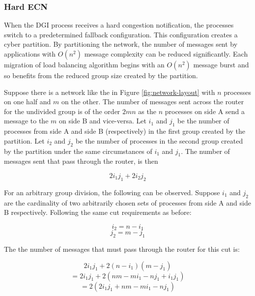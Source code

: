 \subsubsection{Hard \ac{ECN}}

When the \ac{DGI} process receives a hard congestion notification, the processes switch to a predetermined fallback configuration.
This configuration creates a cyber partition.
By partitioning the network, the number of messages sent by applications with $O(n^2)$ message complexity can be reduced significantly.
Each migration of load balancing algorithm begins with an $O(n^2)$ message burst and so benefits from the reduced group size created by the partition.

Suppose there is a network like the in Figure \ref{fig:network-layout} with $n$ processes on one half and $m$ on the other.
The number of messages sent across the router for the undivided group is of the order $2mn$ as the $n$ processes on side A send a message to the $m$ on side B and vice-versa.
Let $i_{1}$ and $j_{1}$ be the number of processes from side A and side B (respectively) in the first group created by the partition.
Let $i_{2}$ and $j_{2}$ be the number of processes in the second group created by the partition under the same circumstances of $i_1$ and $j_1$.
The number of messages sent that pass through the router, is then 

\begin{equation}
2 i_{1} j_{1} + 2 i_{2} j_{2}
\end{equation}

For an arbitrary group division, the following can be observed.
Suppose $i_{1}$ and $j_{2}$ are the cardinality of two arbitrarily chosen sets of processes from side A and side B respectively.
Following the same cut requirements as before:

\begin{equation}
i_2 = n - i_1
\end{equation}
\begin{equation}
j_2 = m - j_1
\end{equation}

The the number of messages that must pass through the router for this cut is:

\begin{equation}
2 i_{1} j_{1} + 2 (n-i_{1}) (m-j_{1})
\end{equation}
\begin{equation}
= 2 i_{1} j_{1} + 2 (nm - mi_{1} - nj_{1} + i_{1}j_{1})
\end{equation}
\begin{equation}
= 2 (2 i_{1} j_{1} + nm - mi_{1} - nj_{1})
\end{equation}

